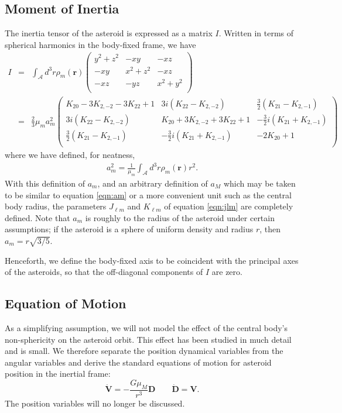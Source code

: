\documentclass{aastex631}
\newcommand{\parens}[1]{\left( #1 \right)}
\begin{document}
\subsection{Moment of Inertia}
The inertia tensor of the asteroid is expressed as a matrix $I$. Written in terms of spherical harmonics in the body-fixed frame, we have
\begin{eqnarray}
I & = &\int_\mathcal{A} d^3 r\rho_m(\bm r) \parens{\begin{array}{ccc}
y^2 + z^2 & -xy & -xz \\
-xy & x^2 + z^2 & -xz \\
-xz & -yz & x^2 + y^2 \\
\end{array}}\\
& = &\frac{2}{3}\mu_m a_m^2\parens{\begin{array}{ccc}
K_{20}-3K_{2,-2}-3K_{22}+1 & 3i \parens{K_{22}-K_{2,-2}} & \frac{3}{2}\parens{K_{21}-K_{2,-1}}\\
3i \parens{K_{22}-K_{2,-2}} & K_{20}+3K_{2,-2}+3K_{22}+1 & -\frac{3}{2}i\parens{K_{21}+K_{2,-1}}\\
\frac{3}{2}\parens{K_{21}-K_{2,-1}} & -\frac{3}{2}i\parens{K_{21}+K_{2,-1}} & -2K_{20}+1\\
\end{array}}
\label{eqn:moi}
\end{eqnarray}
where we have defined, for neatness,
\begin{eqnarray}
a_m^2=\frac{1}{\mu_m}\int_\mathcal{A} d^3 r \rho_m(\bm r) r^2.
\label{eqn:am}
\end{eqnarray}
With this definition of $a_m$, and an arbitrary definition of $a_M$ which may be taken to be similar to equation \ref{eqn:am} or a more convenient unit such as the central body radius, the parameters $J_{\ell m}$ and $K_{\ell m}$ of equation \ref{eqn:jlm} are completely defined. Note that $a_m$ is roughly to the radius of the asteroid under certain assumptions; if the asteroid is a sphere of uniform density and radius $r$, then $a_m = r\sqrt{3/5}$.

Henceforth, we define the body-fixed axis to be coincident with the principal axes of the asteroids, so that the off-diagonal components of $I$ are zero.

\subsection{Equation of Motion}
As a simplifying assumption, we will not model the effect of the central body's non-sphericity on the asteroid orbit. This effect has been studied in much detail and is small. We therefore separate the position dynamical variables from the angular variables and derive the standard equations of motion for asteroid position in the inertial frame:
\begin{equation}
\dot{\bm{V}} = -\frac{G\mu_M}{r^3}\bm{D}\qquad \dot{\bm{D}} = \bm{V}.
\label{eqn:translaton-eom}
\end{equation}
The position variables will no longer be discussed.
\end{document}

